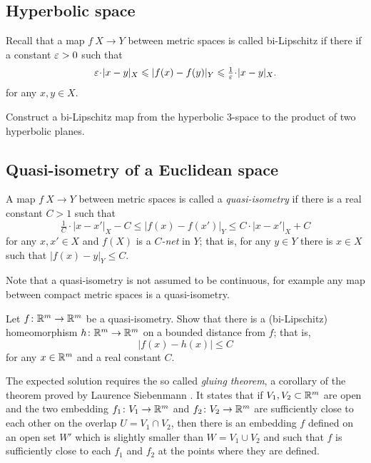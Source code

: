 \subsection*{Hyperbolic space}
\label{Hyperbolic space}

Recall that a map $f\:X\to Y$ between metric spaces is called bi-Lipschitz if there if a constant $\varepsilon>0$
such that 
\[\eps\cdot|x-y|_X\le|f(x)-f(y)|_Y\le\tfrac1\eps\cdot|x-y|_X.\]
for any $x,y\in X$.


\begin{pr}
Construct a bi-Lipschitz map
from the hyperbolic $3$-space 
to the product of two hyperbolic planes.
\end{pr}

\subsection*{Quasi-isometry of a Euclidean space\thm}
\label{hom-near-QI} 

A map $f\:X\to Y$ between metric spaces is called a \emph{quasi-isometry} if there is a  real constant $C>1$ such that 
$$\tfrac{1}{C}\cdot|x-x'|_X-C
\le 
|f(x)-f(x')|_Y\le C\cdot|x-x'|_X+C$$
for any $x,x'\in X$ and $f(X)$ is a \emph{$C$-net} in $Y$;
that is, for any $y\in Y$ there is $x\in X$ such that $|f(x)-y|_Y\le C$.


Note that a quasi-isometry is not assumed to be continuous, for example any map between compact metric spaces is a quasi-isometry.

\begin{pr}
Let $f\colon\mathbb{R}^m\to\mathbb{R}^m$ be a quasi-isometry.
Show that there is a (bi-Lipschitz) homeomorphism 
$h\colon\mathbb{R}^m\to\mathbb{R}^m$ on a bounded distance from $f$;
that is, 
$$|f(x)-h(x)|\le C$$
for any $x\in\mathbb{R}^m$ and a real constant $C$.
\end{pr}

The expected solution requires the so called \emph{gluing theorem},
a corollary of the theorem proved by Laurence Siebenmann \cite[see][]{siebenmann}.
It states that 
if $V_1, V_2\subset\mathbb{R}^m$ are open
and the two embedding $f_1\colon V_1\to\mathbb{R}^m$ and $f_2\colon V_2\to\mathbb{R}^m$ 
are sufficiently close to each other 
on the overlap $U=V_1\cap V_2$, 
then
there is an embedding $f$ defined on an open set $W'$
which is slightly smaller than $W=V_1\cup V_2$
and such that $f$ is sufficiently close to each $f_1$ and $f_2$ at the points where they are defined.

